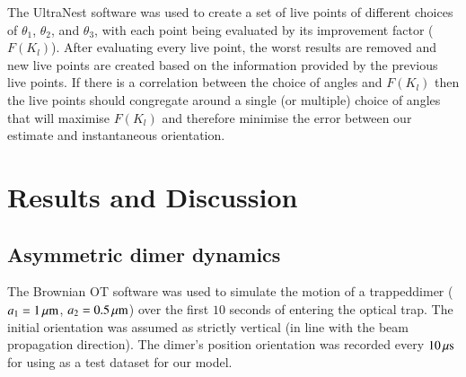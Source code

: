 \documentclass[final, 3p]{elsarticle}
\begin{document}
The UltraNest software was used to create a set of live points of different choices of $\theta_1$, $\theta_2$, and $\theta_3$, with each point being evaluated by its improvement factor ($F(K_l)$). After evaluating every live point, the worst results are removed and new live points are created based on the information provided by the previous live points. If there is a correlation between the choice of angles and $F(K_l)$ then the live points should congregate around a single (or multiple) choice of angles that will maximise $F(K_l)$ and therefore minimise the error between our estimate and instantaneous orientation.


\section{Results and  Discussion}
\label{sec:Discussion}
\subsection{Asymmetric dimer dynamics}
\label{sec:motion}

The Brownian OT software was used to simulate the motion of a trappeddimer ($a_1=1\,{\rm \mu m}$, $a_2=0.5\,{\rm \mu m}$) over the first
$10$ seconds of entering the optical trap.  The initial orientation was assumed as strictly vertical (in line with the beam propagation direction). The dimer's position orientation was recorded every $10\,{\rm \mu s}$ for using as a test dataset for our model.
\end{document}
